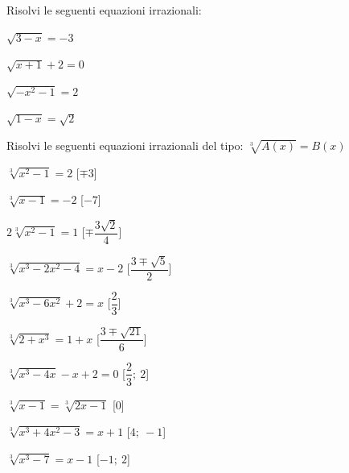 \begin{esercizio}\label{ese:03.1}
Risolvi le seguenti equazioni irrazionali:
\begin{multicols}{4}
\begin{enumeratea}
\item \(\sqrt{3 -x} = -3\)
\item \(\sqrt{x +1} +2 = 0 \)
\item \(\sqrt{-x^2 -1} = 2 \)
\item \(\sqrt{1 -x} = \sqrt{2}\)
\end{enumeratea}
\end{multicols}
\end{esercizio}

\begin{esercizio}\label{ese:03.1}
Risolvi le seguenti equazioni irrazionali del tipo:
\(\sqrt[3]{A(x)} = B(x)\)
\begin{multicols}{2}
\begin{enumeratea}
\item \(\sqrt[3]{x^2 -1} = 2\) \hfill [\(\mp 3\)]
\item \(\sqrt[3]{x -1} = -2\) \hfill [\(-7\)]
\item \(2\sqrt[3]{x^2 -1} = 1\) \hfill [\(\mp \dfrac{3 \sqrt{2}}{4}\)]
\item \(\sqrt[3]{x^3 -2x^2 -4} = x -2\) \hfill [\(\dfrac{3 \mp 
\sqrt{5}}{2}\)]
\item \(\sqrt[3]{x^3 -6x^2} +2 = x\) \hfill [\(\dfrac{2}{3}\)]
\item \(\sqrt[3]{2 +x^3} = 1 +x\) \hfill [\(\dfrac{3 \mp \sqrt{21}}{6}\)]
\item \(\sqrt[3]{x^3 -4x} -x +2 = 0\) \hfill [\(\dfrac{2}{3};~2\)]
\item \(\sqrt[3]{x -1} = \sqrt[3]{2x -1}\) \hfill [\(0\)]
\item \(\sqrt[3]{x^3 +4x^2 -3} = x +1\)
  \hfill [\(4;~-1\)]
\item \(\sqrt[3]{x^3 -7} = x -1\) \hfill [\(-1;~2\)]
\end{enumeratea}
\end{multicols}
\end{esercizio}

